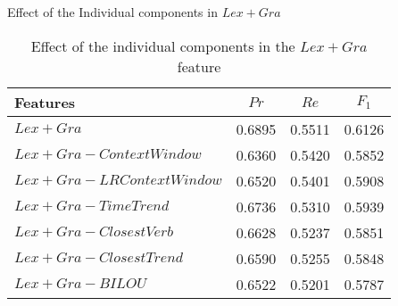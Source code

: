 \begin{frame}{Effect of the Individual components in $Lex+Gra$}

  \begin{table}[htbp]
    \begin{tabular}{|l|r|r|r|}
      \hline
      Features & \multicolumn{1}{c|}{$Pr$} & \multicolumn{1}{c|}{$Re$} & \multicolumn{1}{c|}{$F_1$} \\ \hline
      $Lex+Gra$ & 0.6895 & 0.5511 & 0.6126 \\ \hline
      $Lex+Gra - ContextWindow$ & 0.6360 & 0.5420 & 0.5852 \\ \hline
      $Lex+Gra - LRContextWindow$ & 0.6520 & 0.5401 & 0.5908 \\ \hline
      $Lex+Gra - TimeTrend$ & 0.6736 & 0.5310 & 0.5939 \\ \hline
      $Lex+Gra - ClosestVerb$ & 0.6628 & 0.5237 & 0.5851 \\ \hline
      $Lex+Gra - ClosestTrend$ & 0.6590 & 0.5255 & 0.5848 \\ \hline
      $Lex+Gra - BILOU$ & 0.6522 & 0.5201 & 0.5787 \\ \hline
    \end{tabular}
    \caption{Effect of the individual components in the $Lex+Gra$ feature }
    \label{individual_components_LexGra}
  \end{table}

\end{frame}
